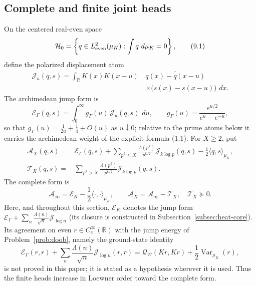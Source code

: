 \documentclass[11pt]{amsart}
\theoremstyle{definition}
\theoremstyle{remark}
\newcommand{\dd}{\,d}
\newcommand{\QW}{\mathcal Q_W}
\DeclareMathOperator{\Var}{Var}
\begin{document}
\subsection{Complete and finite joint heads}

On the centered real-even space
\[
 \mathcal H_0=\left\{q\in L^2_{\rm even}(\mu_K):\int q\,\dd\mu_K=0\right\},
\tag{9.1}
\]
define the polarized displacement atom
\[
\begin{aligned}
 \mathcal J_u(q,s)
 =\int_{\mathbb R}K(x)K(x-u)\,
 &\overline{q(x)-q(x-u)}\\
 &\times\bigl(s(x)-s(x-u)\bigr)\,\dd x .
\end{aligned}
\tag{9.2}
\]
The archimedean jump form is
\[
 \mathscr E_\Gamma(q,s)=\int_0^\infty g_\Gamma(u)\,\mathcal J_u(q,s)\,\dd u,
 \qquad
 g_\Gamma(u)=\frac{e^{u/2}}{e^{u}-e^{-u}} ,
\]
so that \(g_\Gamma(u)=\frac1{2u}+\frac14+O(u)\) as \(u\downarrow0\); relative to the
prime atoms below it carries the archimedean weight of the explicit
formula (1.1).  For \(X\ge2\), put
\[
\begin{aligned}
 \mathcal A_X(q,s)
 ={}&\mathscr E_\Gamma(q,s)
 +\sum_{p^k\le X}\frac{\Lambda(p^k)}{p^{k/2}}
       \mathcal J_{k\log p}(q,s)
 -\frac12\langle q,s\rangle_{\mu_K},\\
 \mathcal T_X(q,s)
 ={}&\sum_{p^k>X}\frac{\Lambda(p^k)}{p^{k/2}}
       \mathcal J_{k\log p}(q,s).
\end{aligned}
\tag{9.3}
\]
The complete form is
\[
 \mathcal A_\infty
 =\mathscr E_K-\frac12\langle\cdot,\cdot\rangle_{\mu_K},
\qquad
 \boxed{\mathcal A_X=\mathcal A_\infty-\mathcal T_X,\quad
        \mathcal T_X\succeq0.}
\tag{9.4}
\]
Here, and throughout this section, \(\mathscr E_K\) denotes the jump form
\(\mathscr E_\Gamma+\sum_{n}\frac{\Lambda(n)}{\sqrt n}\mathcal J_{\log n}\)
(its closure is constructed in Subsection~\ref{subsec:heat-core}).  Its
agreement on even \(r\in C_c^\infty(\mathbb R)\) with the jump energy of
Problem~\ref{prob:doob}, namely the ground-state identity
\[
 \mathscr E_\Gamma(r,r)+\sum_n\frac{\Lambda(n)}{\sqrt n}
 \mathcal J_{\log n}(r,r)
 =\QW(Kr,Kr)+\frac12\Var_{\mu_K}(r),
\]
is not proved in this paper; it is stated as a hypothesis wherever it is
used.
Thus the finite heads increase in Loewner order toward the complete form.
\end{document}
